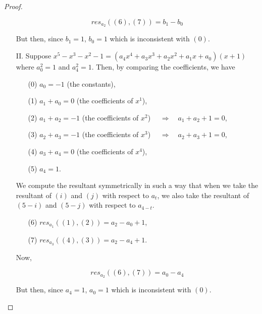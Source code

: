 \documentclass{amsart}
\theoremstyle{definition}
\theoremstyle{remark}
\begin{document}
\begin{proof}
\begin{enumerate}
\begin{equation*}
res_{a_2}((6),(7))=b_1-b_0
\end{equation*}

But then, since $b_1=1$, $b_0=1$ which is inconsistent with $(0)$.
\item[II.] Suppose $x^5-x^3-x^2-1=(a_4x^4+a_3 x^3+a_2 x^2+a_1 x+a_0)(x+1)$ where $a_0^2=1$ and $a_4^2=1$. 
Then, by comparing the coefficients, we have

\begin{enumerate}
\item[(0)] $a_0=-1$ (the constants), \\
\item[(1)] $a_1+ a_0=0$ (the coefficients of $x^1$), \\
\item[(2)] $a_1+a_2=-1$ (the coefficients of $x^2$) $\quad \Rightarrow \quad a_1+a_2+1=0$,\\
\item[(3)] $a_2+a_3=-1$ (the coefficients of $x^3$) $\quad \Rightarrow \quad a_2+a_3+1=0$, \\
\item[(4)] $a_3+a_4=0$ (the coefficients of $x^4$), \\
\item[(5)] $a_4=1$.
\end{enumerate}


We compute the resultant symmetrically in such a way that when we take the resultant of $(i)$ and $(j)$ with respect to $a_{t}$, we also take the resultant of $(5-i)$ and $(5-j)$ with respect to $a_{4-t}$.

\begin{enumerate}
\item[(6)] $res_{a_1}((1),(2))=a_2-a_0+1$,
\item[(7)] $res_{a_3}((4),(3))=a_2-a_4+1$.
\end{enumerate}

Now,

\begin{equation*}
res_{a_2}((6),(7))=a_0-a_4
\end{equation*}

But then, since $a_4=1$, $a_0=1$ which is inconsistent with $(0)$.

\end{enumerate} 


\end{proof}
\end{document}
